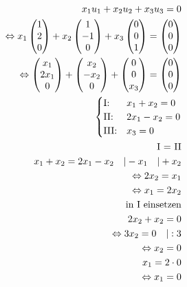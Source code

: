 \begin{align*}
    x_1u_1 + x_2u_2 + x_3u_3 = 0 \\
    \Leftrightarrow x_1\begin{pmatrix}
        1 \\ 2 \\ 0
    \end{pmatrix} + x_2\begin{pmatrix}
        1 \\ -1 \\ 0
    \end{pmatrix} + x_3\begin{pmatrix}
        0  \\ 0 \\ 1
    \end{pmatrix} = \begin{pmatrix}
        0 \\ 0 \\ 0
    \end{pmatrix} \\
    \Leftrightarrow \begin{pmatrix}
        x_1 \\ 2x_1 \\ 0
    \end{pmatrix} + \begin{pmatrix}
        x_2 \\ -x_2 \\ 0
    \end{pmatrix} + \begin{pmatrix}
        0  \\ 0 \\ x_3
    \end{pmatrix} = \begin{pmatrix}
        0 \\ 0 \\ 0
    \end{pmatrix} \\
    \begin{cases}
        \text{I:\@} & x_1 + x_2 = 0 \\
        \text{II:\@} & 2x_1 - x_2 = 0 \\
        \text{III:\@} & x_3 = 0 \\
    \end{cases} \\
    \text{I = II} \\
    x_1 + x_2 = 2x_1 - x_2 \quad | -x_1 \quad | +x_2 \\
    \Leftrightarrow  2x_2 = x_1 \\
    \Leftrightarrow x_1 = 2x_2 \\
    \text{in I einsetzen} \\
    2x_2 + x_2 = 0 \\
    \Leftrightarrow 3x_2 = 0 \quad | : 3 \\
    \Leftrightarrow x_2 = 0 \\
    x_1 = 2 \cdot 0 \\
    \Leftrightarrow x_1 = 0
\end{align*}

